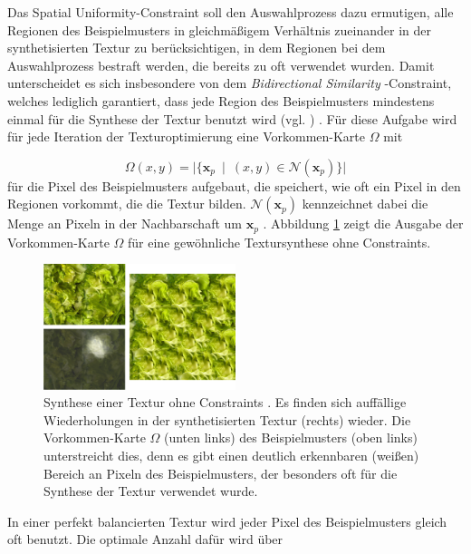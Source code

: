 Das \glqq Spatial Uniformity\grqq -Constraint soll den Auswahlprozess dazu ermutigen, alle Regionen des Beispielmusters in gleichmäßigem Verhältnis zueinander in der synthetisierten Textur zu berücksichtigen, in dem Regionen bei dem Auswahlprozess bestraft werden, die bereits zu oft verwendet wurden.
Damit unterscheidet es sich insbesondere von dem \emph{\glqq Bidirectional Similarity\grqq} -Constraint, welches lediglich garantiert, dass jede Region des Beispielmusters mindestens einmal für die Synthese der Textur benutzt wird (vgl. \cite{BidirectionalSimilarity}) \cite{SelfTuning}.
Für diese Aufgabe wird für jede Iteration der Texturoptimierung eine Vorkommen-Karte $\Omega$ mit

\begin{equation*}
	\Omega(x,y) = \big| \lbrace \textbf{x}_p \ \mid \ (x,y) \in \mathcal{N}(\textbf{x}_p) \rbrace \big|
\end{equation*}
für die Pixel des Beispielmusters aufgebaut, die speichert, wie oft ein Pixel in den Regionen vorkommt, die die Textur bilden.
$\mathcal{N}(\textbf{x}_p)$ kennzeichnet dabei die Menge an Pixeln in der Nachbarschaft um $\textbf{x}_p$ \cite{SelfTuning}.
Abbildung \ref{occurence-map} zeigt die Ausgabe der Vorkommen-Karte $\Omega$ für eine gewöhnliche Textursynthese ohne Constraints.

\begin{figure}
	\centering
	\includegraphics[width=0.5\textwidth]{images/occurence-map}
	\caption{
		Synthese einer Textur ohne Constraints \cite{SelfTuning}.
		Es finden sich auffällige Wiederholungen in der synthetisierten Textur (rechts) wieder.
		Die Vorkommen-Karte $\Omega$ (unten links) des Beispielmusters (oben links) unterstreicht dies, denn es gibt einen deutlich erkennbaren (weißen) Bereich an Pixeln des Beispielmusters, der besonders oft für die Synthese der Textur verwendet wurde.
	}
	\label{occurence-map}
\end{figure}

In einer perfekt balancierten Textur wird jeder Pixel des Beispielmusters gleich oft benutzt.
Die optimale Anzahl dafür wird über

